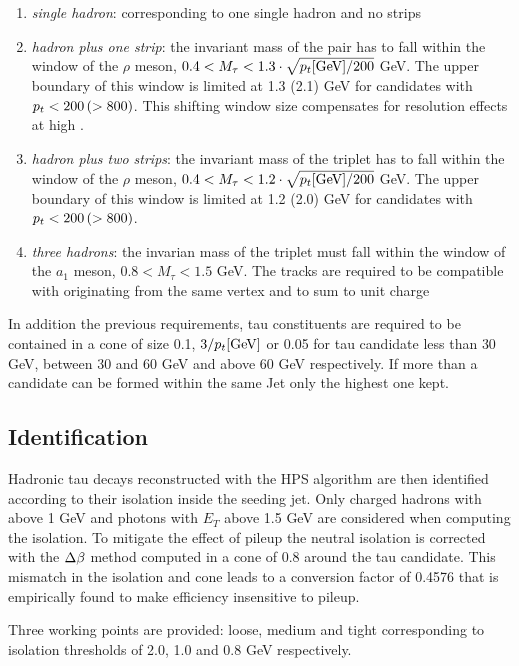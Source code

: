 \begin{enumerate}
\item \emph{single hadron}: corresponding to one single hadron and no strips
\item \emph{hadron plus one strip}: the invariant mass of the pair has to fall within the window of the $\rho$ meson, $0.4 < M_{\tau} < 1.3 \cdot \sqrt{p_{t} \mathrm{[GeV]} / 200}$ GeV. The upper boundary of this window is limited at 1.3 (2.1) GeV for candidates with $p_{t} < 200 \, (> 800)$. This shifting window size compensates for resolution effects at high \pT.
\item \emph{hadron plus two strips}: the invariant mass of the triplet has to fall within the window of the $\rho$ meson, $0.4 < M_{\tau} < 1.2 \cdot \sqrt{p_{t} \mathrm{[GeV]} / 200}$ GeV. The upper boundary of this window is limited at 1.2 (2.0) GeV for candidates with $p_{t} < 200 \, (> 800)$.
\item \emph{three hadrons}: the invarian mass of the triplet must fall within the window of the $a_1$ meson, $0.8 < M_{\tau} < 1.5$ GeV. The tracks are required to be compatible with originating from the same vertex and to sum to unit charge
\end{enumerate}

In addition the previous requirements, tau constituents are required to be contained in a cone of size 0.1, $3 / p_{t} \mathrm{[GeV]}$ or 0.05 for tau candidate \pT less than 30 GeV, between 30 and 60 GeV and above 60 GeV respectively. If more than a candidate can be formed within the same Jet only the highest \pT one kept.

\subsection{Identification}

Hadronic tau decays reconstructed with the HPS algorithm are then identified according to their isolation inside the seeding jet. Only charged hadrons with \pT above 1 GeV and photons with $E_T$ above 1.5 GeV are considered when computing the isolation. To mitigate the effect of pileup the neutral isolation is corrected with the $\Delta\beta$ method computed in a \DR cone of 0.8 around the tau candidate. This mismatch in the isolation and \db cone leads to a conversion factor of 0.4576 that is empirically found to make efficiency insensitive to pileup.

Three working points are provided: loose, medium and tight corresponding to isolation thresholds of 2.0, 1.0 and 0.8 GeV respectively.

